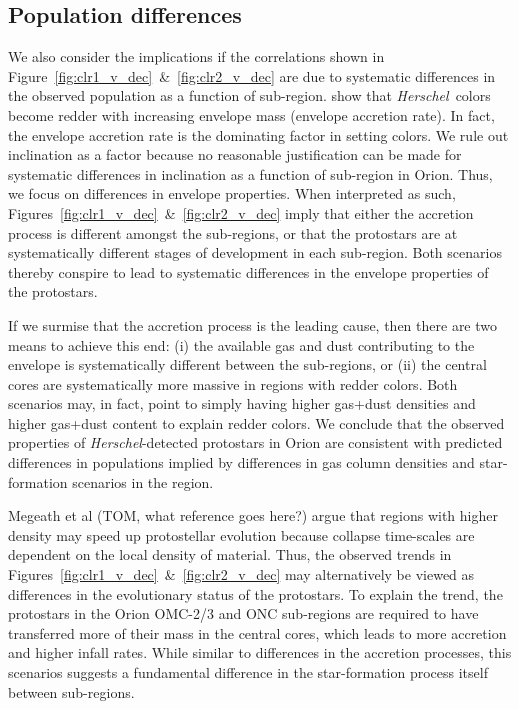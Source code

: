 \documentclass[manuscript]{aastex61}
\newcommand{\herschel}{{\em Herschel}}
\begin{document}
\subsection{Population differences}
\label{sec:popdiff}
\par
We also consider the implications if the correlations shown in Figure~\ref{fig:clr1_v_dec}~\&~\ref{fig:clr2_v_dec} are due to systematic differences in the observed population as a function of sub-region.  \cite{ali} show that \herschel\ colors become redder with increasing envelope mass (envelope accretion rate).  In fact, the envelope accretion rate is the dominating factor in setting colors.  We rule out inclination as a factor because no reasonable justification can be made for systematic differences in inclination as a function of sub-region in Orion.  Thus, we focus on differences in envelope properties.  When interpreted as such, Figures~\ref{fig:clr1_v_dec}~\&~\ref{fig:clr2_v_dec}  imply that either the accretion process is different amongst the sub-regions, or that the protostars are at systematically different stages of development in each sub-region.   Both scenarios thereby conspire to lead to systematic differences in the envelope properties of the protostars.
\par
If we surmise that the accretion process is the leading cause, then there are two means to achieve this end: (i) the available gas and dust contributing to the envelope is systematically different between the sub-regions, or (ii) the central cores are systematically more massive in regions with redder colors.  Both scenarios may, in fact, point to simply having higher gas+dust densities and higher gas+dust content to explain redder colors.  We conclude that the observed properties of \herschel-detected protostars in Orion are consistent with predicted differences in populations implied by differences in gas column densities and star-formation scenarios in the region.
\par
Megeath et al (TOM, what reference goes here?) argue that regions with higher density may speed up protostellar evolution because collapse time-scales are dependent on the local density of material.  Thus, the observed trends in Figures~\ref{fig:clr1_v_dec}~\&~\ref{fig:clr2_v_dec} may alternatively be viewed as differences in the evolutionary status of the protostars.  To explain the trend, the protostars in the Orion OMC-2/3 and ONC sub-regions are required to have transferred more of their mass in the central cores, which leads to more accretion and higher infall rates.  While similar to differences in the accretion processes, this scenarios suggests a fundamental difference in the star-formation process itself between sub-regions.
\end{document}
